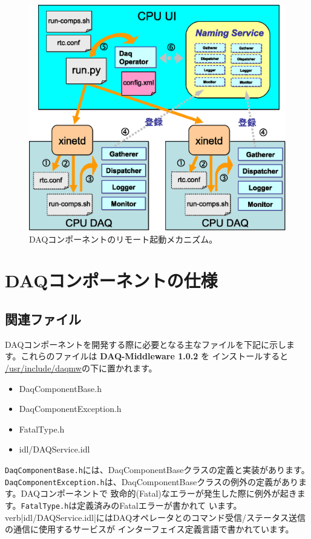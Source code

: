 \documentclass[a4j,10pt,dvips,onecolumn,oneside,final]{jarticle}%
\newcommand {\daqmwcurrent} {
	{\bf DAQ-Middleware 1.0.2}
}
\begin{document}
\begin{figure}[t]
  \centering
  \includegraphics[scale=0.7]{boot.eps}
  \caption{DAQコンポーネントのリモート起動メカニズム。}
  \label{remote-booting.fig}
\end{figure}


\section{DAQコンポーネントの仕様}\label{daqcomp}
\subsection{関連ファイル}
DAQコンポーネントを開発する際に必要となる主なファイルを下記に示します。これらのファイルは\daqmwcurrent を
インストールすると \url{/usr/include/daqmw}の下に置かれます。
\begin{itemize}
\item DaqComponentBase.h
\item DaqComponentException.h
\item FatalType.h
\item idl/DAQService.idl
\end{itemize}
\verb|DaqComponentBase.h|には、DaqComponentBaseクラスの定義と実装があります。
\verb|DaqComponentException.h|は、DaqComponentBaseクラスの例外の定義があります。DAQコンポーネントで
致命的(Fatal)なエラーが発生した際に例外が起きます。\verb|FatalType.h|は定義済みのFatalエラーが書かれて
います。verb|idl/DAQService.idl|にはDAQオペレータとのコマンド受信/ステータス送信の通信に使用するサービスが
インターフェイス定義言語で書かれています。
\end{document}
